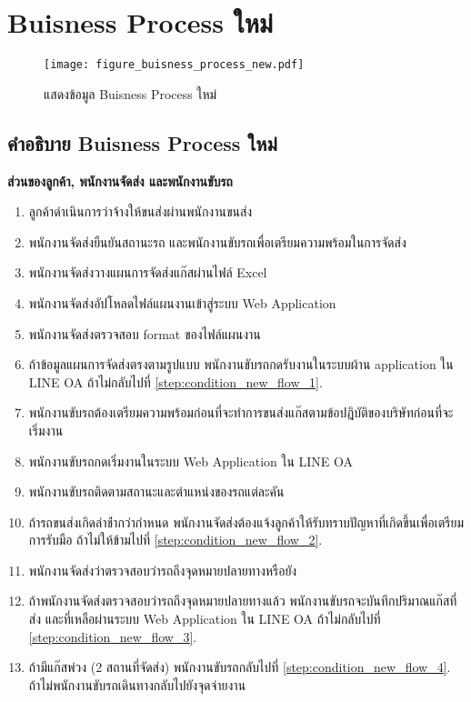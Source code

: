\section{Buisness Process ใหม่}
\begin{figure}[h!]
    \centering
    \texttt{[image: figure\_buisness\_process\_new.pdf]}
    \caption{แสดงข้อมูล Buisness Process ใหม่}
    \label{fig:buisness_process_new_main}
\end{figure}

\subsection{คำอธิบาย Buisness Process ใหม่}
\textbf{ส่วนของลูกค้า, พนักงานจัดส่ง และพนักงานขับรถ}
\begin{enumerate}
    \item ลูกค้าดำเนินการว่าจ้างให้ขนส่งผ่านพนักงานขนส่ง
    \item พนักงานจัดส่งยืนยันสถานะรถ และพนักงานขับรถเพื่อเตรียมความพร้อมในการจัดส่ง
    \item พนักงานจัดส่งวางแผนการจัดส่งแก๊สผ่านไฟล์ Excel
    \item พนักงานจัดส่งอัปโหลดไฟล์แผนงานเข้าสู่ระบบ Web Application \label{step:condition_new_flow_1}
    \item พนักงานจัดส่งตรวจสอบ format ของไฟล์แผนงาน
    \item ถ้าข้อมูลแผนการจัดส่งตรงตามรูปแบบ พนักงานขับรถกดรับงานในระบบผ้าน application ใน LINE OA ถ้าไม่กลับไปที่ \ref{step:condition_new_flow_1}.
    \item พนักงานขับรถต้องเตรียมความพร้อมก่อนที่จะทำการขนส่งแก๊สตามข้อปฎิบัติของบริษัทก่อนที่จะเริ่มงาน
    \item พนักงานขับรถกดเริ่มงานในระบบ Web Application ใน LINE OA
    \item พนักงานขับรถติดตามสถานะและตำแหน่งของรถแต่ละคัน\label{step:condition_new_flow_3}
    \item ถ้ารถขนส่งเกิดล่าช้่ากว่ากำหนด พนักงานจัดส่งต้องแจ้งลูกค้าให้รับทราบปัญหาที่เกิดขึ้นเพื่อเตรียมการรับมือ ถ้าไม่ให้ข้ามไปที่ \ref{step:condition_new_flow_2}.
    \item พนักงานจัดส่งว่าตรวจสอบว่ารถถึงจุดหมายปลายทางหรือยัง \label{step:condition_new_flow_2}
    \item ถ้าพนักงานจัดส่งตรวจสอบว่ารถถึงจุดหมายปลายทางแล้ว พนักงานขับรถจะบันทึกปริมาณแก๊สที่ส่ง และที่เหลือผ่านระบบ Web Application ใน LINE OA ถ้าไม่กลับไปที่  \ref{step:condition_new_flow_3}.
    \item ถ้ามีแก๊สพ่วง (2 สถานที่จัดส่ง) พนักงานขับรถกลับไปที่ \ref{step:condition_new_flow_4}. ถ้าไม่พนักงานขับรถเดินทางกลับไปยังจุดจ่ายงาน

\end{enumerate}

